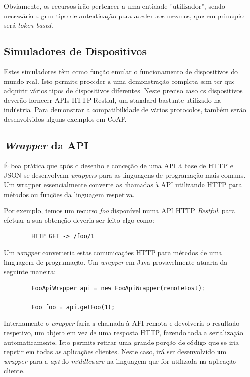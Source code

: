 Obviamente, os recursos irão pertencer a uma entidade ''utilizador'', sendo necessário algum tipo de autenticação para aceder aos mesmos, que em princípio será \textit{token-based}.
\subsection{Simuladores de Dispositivos}

Estes simuladores têm como função emular o funcionamento de dispositivos do mundo real. Isto permite proceder a uma demonstração completa sem ter que adquirir vários tipos de dispositivos diferentes. Neste preciso caso os dispositivos deverão fornecer APIs HTTP Restful, um standard bastante utilizado na indústria. Para demonstrar a compatibilidade de vários protocolos, também serão desenvolvidos alguns exemplos em CoAP.

\subsection{\textit{Wrapper} da API}

É boa prática que após o desenho e conceção de uma API à base de HTTP e JSON se desenvolvam \textit{wrappers} para as linguagens de programação mais comuns. Um wrapper essencialmente converte as chamadas à API utilizando HTTP para métodos ou funções da linguagem respetiva.

Por exemplo, temos um recurso \textit{foo} disponível numa API HTTP \textit{Restful}, para efetuar a sua obtenção deveria ser feito algo como:

\begin{verbatim}
        HTTP GET -> /foo/1
\end{verbatim}

Um \textit{wrapper} converteria estas comunicações HTTP para métodos de uma linguagem de programação. Um \textit{wrapper} em Java provavelmente atuaria da seguinte maneira:

\begin{verbatim}
        FooApiWrapper api = new FooApiWrapper(remoteHost);
    
        Foo foo = api.getFoo(1);
\end{verbatim}


Internamente o \textit{wrapper} faria a chamada à API remota e devolveria o resultado respetivo, um objeto em vez de uma resposta HTTP, fazendo toda a serialização automaticamente. Isto permite retirar uma grande porção de código que se iria repetir em todas as aplicações clientes. Neste caso, irá ser desenvolvido um \textit{wrapper} para a \textit{api} do \textit{middleware} na linguagem que for utilizada na aplicação cliente.

